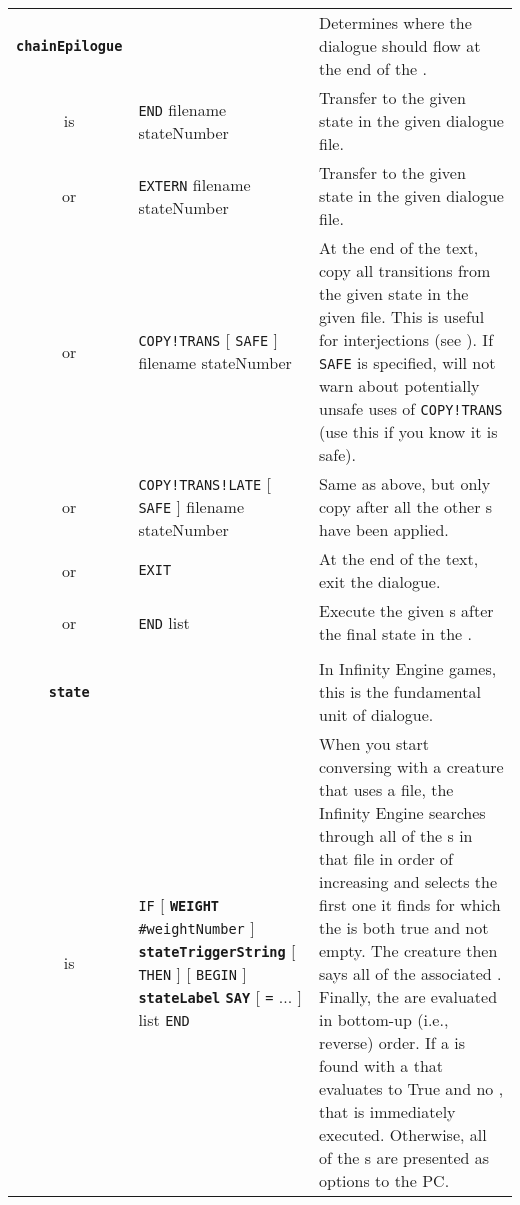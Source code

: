 \documentclass{article}
\def\ttref#1{\ahrefloc{#1}{\tt #1}}
\def\DEFINE#1{{\tt \bf #1}\label{#1}\index{#1}}
\def\t#1{{\tt #1}}
\def\Slist{{\color{red} list }}
\def\Ob{{\color{red} [ }}
\def\Oe{{\color{red} ] }}
\begin{document}
\begin{tabular}{cp{10in}|p{10in}}
\\

\DEFINE{chainEpilogue} & & Determines where the dialogue should flow at the
end of the \ttref{CHAIN}. \\
is & {\tt END} filename stateNumber & Transfer to the given state in the given dialogue file. \\
or & {\tt EXTERN} filename stateNumber & Transfer to the given state in the given dialogue file. \\
or & {\tt COPY!TRANS} \Ob \t{SAFE} \Oe filename stateNumber & At the end of the
\ttref{CHAIN} text, copy all transitions from the given state in the
given file. This is useful for interjections (see \ttref{INTERJECT}). If \t{SAFE} is specified, \ttref{CHAIN} will not warn about potentially unsafe uses of \t{COPY!TRANS} (use this if you know it is safe). \\
or & {\tt COPY!TRANS!LATE} \Ob \t{SAFE} \Oe filename stateNumber & Same as above, but only copy after all the other \ttref{D Action}s have been applied. \\
or & {\tt EXIT} & At the end of the \ttref{CHAIN} text, exit the dialogue.\\
or & {\tt END} \ttref{transition} \Slist & Execute the given \ttref{transition}s
after the final state in the \ttref{CHAIN}. \\

\\

\DEFINE{state} & & In Infinity Engine games, this is the fundamental unit
of dialogue. \\
is & {\tt IF} \Ob \DEFINE{WEIGHT} \t{\#weightNumber} \Oe \DEFINE{stateTriggerString} \Ob {\tt THEN} \Oe
  \Ob {\tt BEGIN} \Oe \DEFINE{stateLabel} \DEFINE{SAY} \ttref{sayText} \Ob \t{=}
  \ttref{sayText} ... \Oe \ttref{transition} \Slist \t{END} &
  When you start conversing with a creature that uses a \ttref{DLG} file, the
  Infinity Engine searches through all of the \ttref{state}s in that file
  in order of increasing \ttref{WEIGHT} and selects the first one it finds
  for which the \ttref{stateTriggerString} is both true and not empty.
  The creature then says all of the associated \ttref{sayText}. Finally,
  the \ttref{transitions} are evaluated in bottom-up (i.e., reverse) order.
  If a \ttref{transition} is found with a \ttref{transTriggerString} that
  evaluates to True and no \ttref{replyText}, that \ttref{transition} is
  immediately executed. Otherwise, all of the \ttref{transition}s are
  presented as options to the PC.


\end{tabular}
\end{document}
